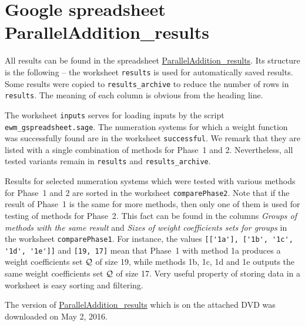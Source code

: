 \section{Google spreadsheet ParallelAddition\_results}
\label{sec:gspreadsheet}
All results can be found in the spreadsheet \href{https://docs.google.com/spreadsheets/d/1TnhrHdefHfHa0WSeVs4q6XVj3epjPlPlnoekE0E1xeM/edit?usp=sharing}{ParallelAddition\_results}. Its structure is the following -- the worksheet \verb+results+ is used for automatically saved results. Some results were copied to \verb+results_archive+ to reduce the number of rows in \verb+results+. The meaning of each column is obvious from the heading line.

The worksheet \verb+inputs+ serves for loading inputs by the script \verb+ewm_gspreadsheet.sage+. The numeration systems for which a weight function was successfully found are in the worksheet \verb+successful+. We remark that they are listed with a single combination of methods for Phase~1 and 2. Nevertheless, all tested variants remain in \verb+results+ and \verb+results_archive+. 

Results for selected numeration systems which were tested with various  methods for Phase~1 and 2 are sorted in the worksheet \verb+comparePhase2+. Note that if the result of Phase~1 is the same for more methods, then only one of them is used for testing of methods for Phase~2. This fact can be found in the columns \emph{Groups of methods with the same result} and \emph{Sizes of weight coefficients sets for groups} in the worksheet \verb+comparePhase1+. For instance, the values \verb+[['1a'], ['1b', '1c', '1d', '1e']]+ and \verb+[19, 17]+ mean that Phase~1 with method 1a produces a weight coefficients set $\mathcal{Q}$ of size 19, while methods 1b, 1c, 1d and 1e outputs the same weight coefficients set $\mathcal{Q}$ of size 17.
Very useful property of storing data in a worksheet is easy sorting and filtering.

The version of \href{https://docs.google.com/spreadsheets/d/1TnhrHdefHfHa0WSeVs4q6XVj3epjPlPlnoekE0E1xeM/edit?usp=sharing}{ParallelAddition\_results} which is on the attached DVD was downloaded on May 2, 2016.

